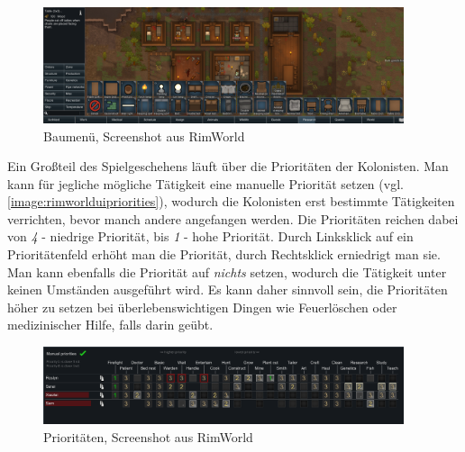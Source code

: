 \begin{figure}
    \begin{center}
        \includegraphics[width=400px]{0.bilder/rimworlduimenu.png}
    \end{center}
    \caption{Baumenü, Screenshot aus RimWorld} \label{image:rimworlduimenu}
\end{figure}

Ein Großteil des Spielgeschehens läuft über die Prioritäten der Kolonisten. Man kann für jegliche mögliche Tätigkeit eine manuelle Priorität setzen (vgl. \autoref{image:rimworlduipriorities}), wodurch die Kolonisten erst bestimmte Tätigkeiten verrichten, bevor manch andere angefangen werden. Die Prioritäten reichen dabei von \textit{4} - niedrige Priorität, bis \textit{1} - hohe Priorität. Durch Linksklick auf ein Prioritätenfeld erhöht man die Priorität, durch Rechtsklick erniedrigt man sie. Man kann ebenfalls die Priorität auf \textit{nichts} setzen, wodurch die Tätigkeit unter keinen Umständen ausgeführt wird. Es kann daher sinnvoll sein, die Prioritäten höher zu setzen bei überlebenswichtigen Dingen wie Feuerlöschen oder medizinischer Hilfe, falls darin geübt.
\begin{figure}
    \begin{center}
        \includegraphics[width=400px]{0.bilder/rimworlduipriorities.png}
    \end{center}
    \caption{Prioritäten, Screenshot aus RimWorld} \label{image:rimworlduipriorities}
\end{figure}


